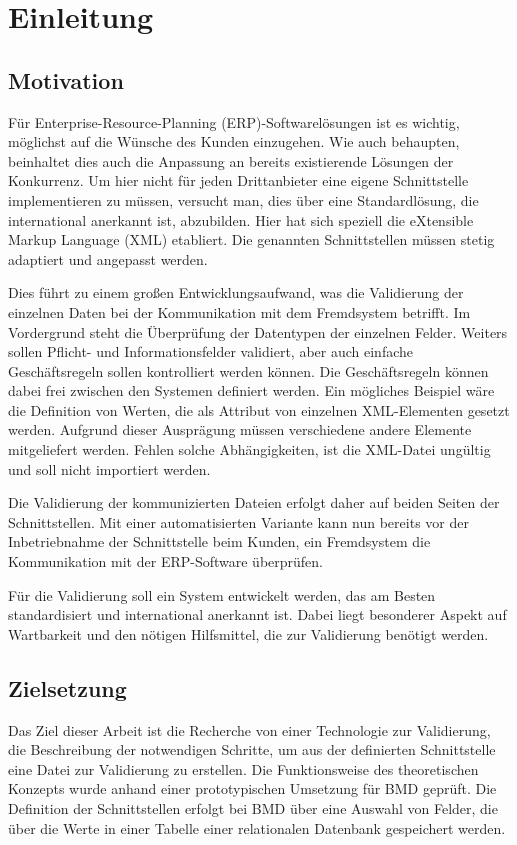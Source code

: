 \chapter{Einleitung}
\label{cha:Einleitung}

\section{Motivation}
Für Enterprise-Resource-Planning (ERP)-Softwarelösungen ist es wichtig, möglichst auf die Wünsche des Kunden einzugehen. Wie auch \textcite{Jeffrey2004} behaupten, beinhaltet dies auch die Anpassung an bereits existierende Lösungen der Konkurrenz. 
Um hier nicht für jeden Drittanbieter eine eigene Schnittstelle implementieren zu müssen, versucht man, dies über eine Standardlösung, die international anerkannt ist, abzubilden. Hier hat sich speziell die eXtensible Markup Language (XML) etabliert. Die genannten Schnittstellen müssen stetig adaptiert und angepasst werden. 

Dies führt zu einem großen Entwicklungsaufwand, was die Validierung der einzelnen Daten bei der Kommunikation mit dem Fremdsystem betrifft. 
Im Vordergrund steht die Überprüfung der Datentypen der einzelnen Felder. Weiters sollen Pflicht- und Informationsfelder validiert, aber auch einfache Geschäftsregeln sollen kontrolliert werden können. 
Die Geschäftsregeln können dabei frei zwischen den Systemen definiert werden. Ein mögliches Beispiel wäre die Definition von Werten, die als Attribut von einzelnen XML-Elementen gesetzt werden. Aufgrund dieser Ausprägung müssen verschiedene andere Elemente mitgeliefert werden. Fehlen solche Abhängigkeiten, ist die XML-Datei ungültig und soll nicht importiert werden.

Die Validierung der kommunizierten Dateien erfolgt daher auf beiden Seiten der Schnittstellen. Mit einer automatisierten Variante kann nun bereits vor der Inbetriebnahme der Schnittstelle beim Kunden, ein Fremdsystem die Kommunikation mit der ERP-Software überprüfen. 

Für die Validierung soll ein System entwickelt werden, das am Besten standardisiert und international anerkannt ist.
Dabei liegt besonderer Aspekt auf Wartbarkeit und den nötigen Hilfsmittel, die zur Validierung benötigt werden.


\section{Zielsetzung}
Das Ziel dieser Arbeit ist die Recherche von einer Technologie zur Validierung, die Beschreibung der notwendigen Schritte, um aus der definierten Schnittstelle eine Datei zur Validierung zu erstellen. Die Funktionsweise des theoretischen Konzepts wurde anhand einer prototypischen Umsetzung für BMD geprüft. Die Definition der Schnittstellen erfolgt bei BMD über eine Auswahl von Felder, die über die Werte in einer Tabelle einer relationalen Datenbank gespeichert werden. 

